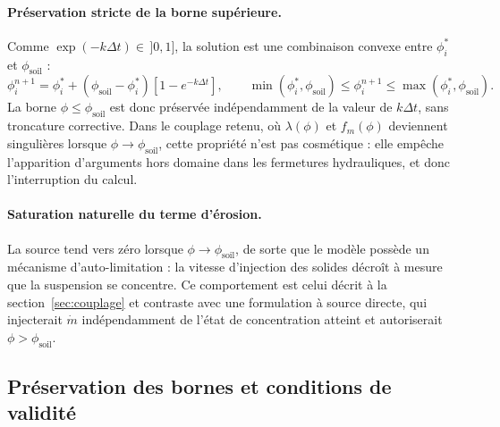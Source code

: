 \documentclass[11pt,a4paper]{report}
\newcommand{\phisol}{\phi_{\mathrm{soil}}}
\newcommand{\mdot}{\dot{m}}
\newcommand{\dt}{\Delta t}
\begin{document}
\paragraph{Préservation stricte de la borne supérieure.} Comme \(\exp(-k\dt)\in\,]0,1]\), la solution est
une combinaison convexe entre \(\phi_i^*\) et \(\phisol\) :
\begin{equation}
\phi_i^{n+1} = \phi_i^* + \left(\phisol-\phi_i^*\right)\left[1 - e^{-k\dt}\right],
\qquad
\min\left(\phi_i^*,\phisol\right) \le \phi_i^{n+1} \le \max\left(\phi_i^*,\phisol\right).
\label{eq:convexite}
\end{equation}
La borne \(\phi\le\phisol\) est donc préservée indépendamment de la valeur de \(k\dt\), sans troncature
corrective. Dans le couplage retenu, où \(\lambda(\phi)\) et \(f_m(\phi)\) deviennent singulières lorsque
\(\phi\to\phisol\), cette propriété n'est pas cosmétique : elle empêche l'apparition d'arguments hors
domaine dans les fermetures hydrauliques, et donc l'interruption du calcul.

\paragraph{Saturation naturelle du terme d'érosion.} La source tend vers zéro lorsque
\(\phi\to\phisol\), de sorte que le modèle possède un mécanisme d'auto-limitation : la vitesse
d'injection des solides décroît à mesure que la suspension se concentre. Ce comportement est celui décrit à
la section~\ref{sec:couplage} et contraste avec une formulation à source directe, qui injecterait
\(\mdot\) indépendamment de l'état de concentration atteint et autoriserait \(\phi > \phisol\).

\subsection{Préservation des bornes et conditions de validité}
\end{document}
